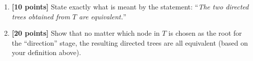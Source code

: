 \begin{enumerate}
      \begin{enumerate}
        \item {\bf [10 points]}
          State exactly what is meant by the statement: ``\emph{The two directed trees
          obtained from $T$ are equivalent.}''

        \item {\bf [20 points]}
          Show that no matter which node in $T$ is chosen as the root for the
          ``direction'' stage, the resulting directed trees are all equivalent (based
          on your definition above).

      \end{enumerate}

  \end{enumerate}
  
